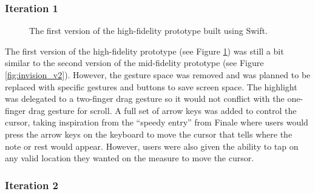 			\subsubsection{Iteration 1}

				\begin{figure}[H]
					\centering
				    \caption{The first version of the high-fidelity prototype built using Swift.}
				    \label{fig:flow_it1}
				\end{figure} 


				The first version of the high-fidelity prototype (see Figure \ref{fig:flow_it1}) was still a bit similar to the second version of the mid-fidelity prototype (see Figure \ref{fig:invision_v2}). However, the gesture space was removed and was planned to be replaced with specific gestures and buttons to save screen space. The highlight was delegated to a two-finger drag gesture so it would not conflict with the one-finger drag gesture for scroll. A full set of arrow keys was added to control the cursor, taking inspiration from the ``speedy entry'' from Finale where users would press the arrow keys on the keyboard to move the cursor that tells where the note or rest would appear. However, users were also given the ability to tap on any valid location they wanted on the measure to move the cursor. 

			\subsubsection{Iteration 2}

